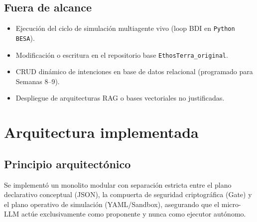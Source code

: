 \documentclass[11pt,a4paper]{article}
\begin{document}
\subsection{Fuera de alcance}
\begin{itemize}[leftmargin=*]
    \item Ejecución del ciclo de simulación multiagente vivo (loop BDI en \texttt{Python BESA}).
    \item Modificación o escritura en el repositorio base \texttt{EthosTerra\_original}.
    \item CRUD dinámico de intenciones en base de datos relacional (programado para Semanas 8--9).
    \item Despliegue de arquitecturas RAG o bases vectoriales no justificadas.
\end{itemize}

\section{Arquitectura implementada}

\subsection{Principio arquitectónico}
Se implementó un monolito modular con separación estricta entre el plano declarativo conceptual (JSON), la compuerta de seguridad criptográfica (Gate) y el plano operativo de simulación (YAML/Sandbox), asegurando que el micro-LLM actúe exclusivamente como proponente y nunca como ejecutor autónomo.
\end{document}
